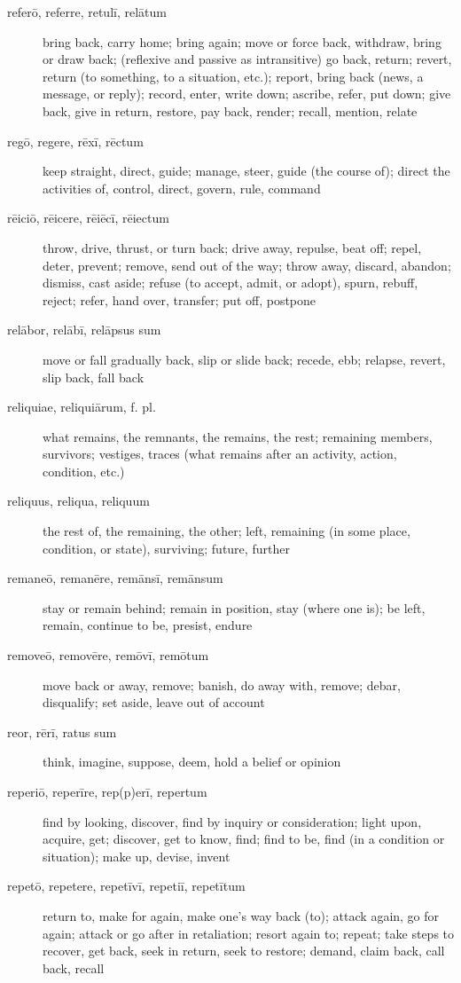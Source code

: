 \begin{description}
    \item[referō, referre, retulī, relātum] bring back, carry home; bring again; move or force back, withdraw, bring or draw back; (reflexive and passive as intransitive) go back, return; revert, return (to something, to a situation, etc.); report, bring back (news, a message, or reply); record, enter, write down; ascribe, refer, put down; give back, give in return, restore, pay back, render; recall, mention, relate
    \item[regō, regere, rēxī, rēctum] keep straight, direct, guide; manage, steer, guide (the course of); direct the activities of, control, direct, govern, rule, command
    \item[rēiciō, rēicere, rēiēcī, rēiectum] throw, drive, thrust, or turn back; drive away, repulse, beat off; repel, deter, prevent; remove, send out of the way; throw away, discard, abandon; dismiss, cast aside; refuse (to accept, admit, or adopt), spurn, rebuff, reject; refer, hand over, transfer; put off, postpone
    \item[relābor, relābī, relāpsus sum] move or fall gradually back, slip or slide back; recede, ebb; relapse, revert, slip back, fall back
    \item[reliquiae, reliquiārum, f. pl.] what remains, the remnants, the remains, the rest; remaining members, survivors; vestiges, traces (what remains after an activity, action, condition, etc.)
    \item[reliquus, reliqua, reliquum] the rest of, the remaining, the other; left, remaining (in some place, condition, or state), surviving; future, further
    \item[remaneō, remanēre, remānsī, remānsum] stay or remain behind; remain in position, stay (where one is); be left, remain, continue to be, presist, endure
    \item[removeō, removēre, remōvī, remōtum] move back or away, remove; banish, do away with, remove; debar, disqualify; set aside, leave out of account
    \item[reor, rērī, ratus sum] think, imagine, suppose, deem, hold a belief or opinion
    \item[reperiō, reperīre, rep(p)erī, repertum] find by looking, discover, find by inquiry or consideration; light upon, acquire, get; discover, get to know, find; find to be, find (in a condition or situation); make up, devise, invent
    \item[repetō, repetere, repetīvī, repetiī, repetītum] return to, make for again, make one's way back (to); attack again, go for again; attack or go after in retaliation; resort again to; repeat; take steps to recover, get back, seek in return, seek to restore; demand, claim back, call back, recall

\end{description}

